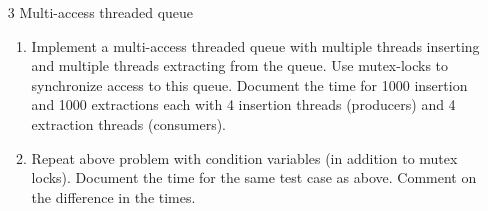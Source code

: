 \documentclass{sem5}
\begin{document}
\begin{itemize}
\item[3] Multi-access threaded queue
\begin{enumerate}
\item Implement a multi-access threaded queue with multiple threads inserting and multiple threads extracting from the queue. Use mutex-locks to synchronize access to this queue. Document the time for 1000 insertion and 1000 extractions each with 4 insertion threads (producers) and 4 extraction threads (consumers).

\item Repeat above problem with condition variables (in addition to mutex locks). Document the time for the same test case as above. Comment on the difference in the times.

\end{enumerate}
\end{itemize}
\end{document}
